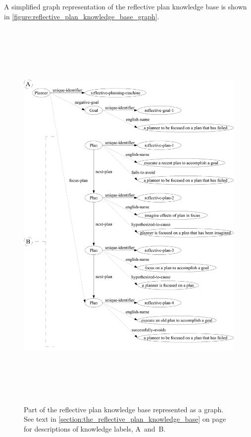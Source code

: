 A simplified graph representation of the reflective plan knowledge
base is shown in
{\mbox{\autoref{figure:reflective_plan_knowledge_base_graph}}}.
\label{page:reflective_plan_knowledge_base_graph-label_descriptions}
\begin{figure}
\hspace*{-2cm}\includegraphics[height=20cm]{gfx/reflective_plan_knowledge_base_graph-handdrawn}
\caption[Part of the reflective plan knowledge base represented as a
  graph.]{Part of the reflective plan knowledge base represented as a
  graph.  See text in
  {\mbox{\autoref{section:the_reflective_plan_knowledge_base}}} on
  {\mbox{page~\pageref{page:reflective_plan_knowledge_base_graph-label_descriptions}}}
  for descriptions of knowledge labels, {\mbox{A~and~B}}.}
\label{figure:reflective_plan_knowledge_base_graph}
\end{figure}

